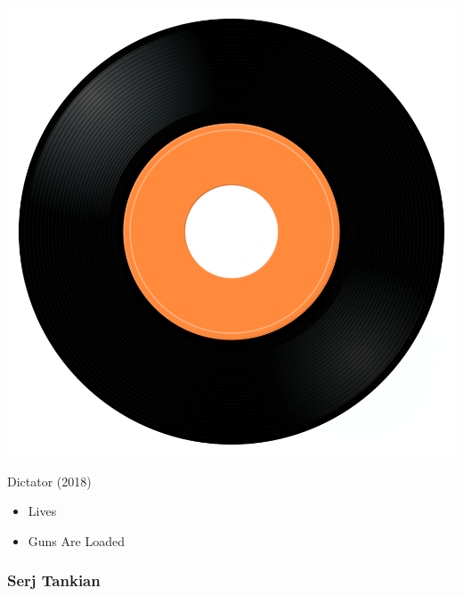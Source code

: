 \begin{minipage}[t]{0.25\textwidth}\vspace{0pt}
\captionsetup{type=figure}
\includegraphics[width=\textwidth]{Images/cover.png}
\caption*{Dictator (2018)}
\end{minipage}
\begin{minipage}[t]{0.25\textwidth}\vspace{0pt}
\begin{itemize}[nosep,leftmargin=1em,labelwidth=*,align=left]
	\setlength{\itemsep}{0pt}
	\item Lives
	\item Guns Are Loaded
\end{itemize}
\end{minipage}

\subsubsection{Serj Tankian}

